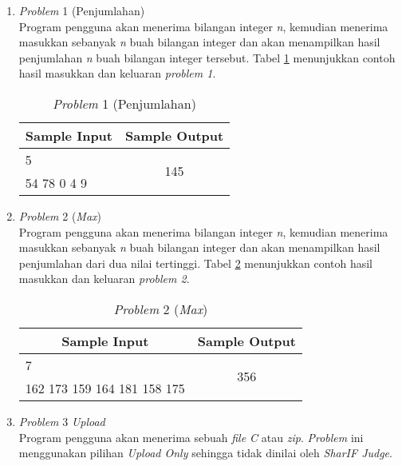 \begin{enumerate}
	\item \textit{Problem} 1 (Penjumlahan) \\
	Program pengguna akan menerima bilangan integer \textit{n}, kemudian menerima masukkan sebanyak \textit{n} buah bilangan integer dan akan menampilkan hasil penjumlahan \textit{n} buah bilangan integer tersebut. Tabel \ref{tab:problem_sum} menunjukkan contoh hasil masukkan dan keluaran \textit{problem 1}.
	
	\begin{table}[H]
		\centering 
		\caption{\textit{Problem} 1 (Penjumlahan)}
		\label{tab:problem_sum}
		\begin{tabular}{|c|c|}
			\hline
			Sample Input & Sample Output\\
			
			\hline
			\multicolumn{1}{|l|}{5} & \multirow{2}{*}{145}\\
			\multicolumn{1}{|l|}{54 78 0 4 9} & \\
			
			\hline
			
		\end{tabular} 
	\end{table}
	
	\item \textit{Problem} 2 (\textit{Max}) \\
	Program pengguna akan menerima bilangan integer \textit{n}, kemudian menerima masukkan sebanyak \textit{n} buah bilangan integer dan akan menampilkan hasil penjumlahan dari dua nilai tertinggi. Tabel \ref{tab:problem_max} menunjukkan contoh hasil masukkan dan keluaran \textit{problem 2}.
	
	\begin{table}[H]
		\centering 
		\caption{\textit{Problem} 2 (\textit{Max})}
		\label{tab:problem_max}
		\begin{tabular}{|c|c|}
			\hline
			Sample Input & Sample Output\\
			
			\hline
			\multicolumn{1}{|l|}{7} & \multirow{2}{*}{356}\\
			\multicolumn{1}{|l|}{162 173 159 164 181 158 175} & \\
			
			\hline
			
		\end{tabular} 
	\end{table}
	
	\item \textit{Problem} 3 \textit{Upload} \\
	Program pengguna akan menerima sebuah \textit{file C} atau \textit{zip}. \textit{Problem} ini menggunakan pilihan \textit{Upload Only} sehingga tidak dinilai oleh \textit{SharIF Judge}.
\end{enumerate}

